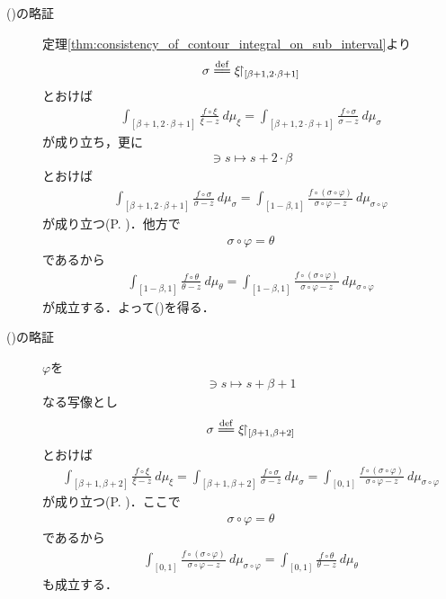 \begin{description}
		\item[()の略証]	
			定理\ref{thm:consistency_of_contour_integral_on_sub_interval}より
			\begin{align}
				\sigma \defeq \xi \rest_{[\beta+1,2\cdot\beta+1]}
			\end{align}
			とおけば
			\begin{align}
				\int_{[\beta+1,2\cdot\beta+1]} \frac{f \circ \xi}{\xi - z}\ d\mu_{\xi}
				= \int_{[\beta+1,2\cdot\beta+1]} \frac{f \circ \sigma}{\sigma - z}\ d\mu_{\sigma}
			\end{align}
			が成り立ち，更に
			\begin{align}
				[0,1] \ni s \longmapsto s + 2 \cdot \beta
			\end{align}
			とおけば
			\begin{align}
				\int_{[\beta+1,2\cdot\beta+1]} \frac{f \circ \sigma}{\sigma - z}\ d\mu_{\sigma}
				= \int_{[1-\beta,1]} \frac{f \circ (\sigma \circ \varphi)}{\sigma \circ \varphi - z}\ d\mu_{\sigma \circ \varphi}
			\end{align}
			が成り立つ(P. \pageref{fom:change_of_parameter_interval_complex_contour_integral})．他方で
			\begin{align}
				\sigma \circ \varphi = \theta
			\end{align}
			であるから
			\begin{align}
				\int_{[1-\beta,1]} \frac{f \circ \theta}{\theta - z}\ d\mu_{\theta}
				= \int_{[1-\beta,1]} \frac{f \circ (\sigma \circ \varphi)}{\sigma \circ \varphi - z}\ d\mu_{\sigma \circ \varphi}
			\end{align}
			が成立する．よって()を得る．
			
		\item[()の略証]
			$\varphi$を
			\begin{align}
				[0,1] \ni s \longmapsto s + \beta + 1
			\end{align}
			なる写像とし
			\begin{align}
				\sigma \defeq \xi \rest_{[\beta+1,\beta+2]}
			\end{align}
			とおけば
			\begin{align}
				\int_{[\beta+1,\beta+2]} \frac{f \circ \xi}{\xi - z}\ d\mu_{\xi}
				= \int_{[\beta+1,\beta+2]} \frac{f \circ \sigma}{\sigma - z}\ d\mu_{\sigma}
				= \int_{[0,1]} \frac{f \circ (\sigma \circ \varphi)}{\sigma \circ \varphi - z}\ d\mu_{\sigma \circ \varphi}
			\end{align}
			が成り立つ(P. \pageref{fom:change_of_parameter_interval_complex_contour_integral})．ここで
			\begin{align}
				\sigma \circ \varphi = \theta
			\end{align}
			であるから
			\begin{align}
				\int_{[0,1]} \frac{f \circ (\sigma \circ \varphi)}{\sigma \circ \varphi - z}\ d\mu_{\sigma \circ \varphi}
				= \int_{[0,1]} \frac{f \circ \theta}{\theta - z}\ d\mu_{\theta}
			\end{align}
			も成立する．
			

\end{description}
